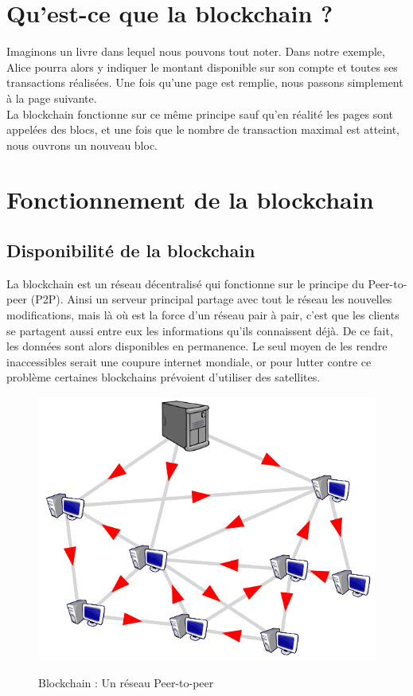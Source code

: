 \documentclass[12pt, a4paper, oneside]{book}
\begin{document}
    \section{Qu'est-ce que la blockchain ?}
    Imaginons un livre dans lequel nous pouvons tout noter. Dans notre exemple, Alice pourra alors y indiquer le montant disponible sur son compte et toutes ses transactions réalisées. Une fois qu’une page est remplie, nous passons simplement à la page suivante.
    \\
    La blockchain fonctionne sur ce même principe sauf qu’en réalité les pages sont appelées des blocs, et une fois que le nombre de transaction maximal est atteint, nous ouvrons un nouveau bloc.

    \section{Fonctionnement de la blockchain}
    
    \subsection{Disponibilité de la blockchain}
    La blockchain est un réseau décentralisé qui fonctionne sur le principe du Peer-to-peer (P2P). 
    Ainsi un serveur principal partage avec tout le réseau les nouvelles modifications, mais là où est la force d'un réseau pair à pair, c'est que les clients se partagent aussi 
    entre eux les informations qu'ils connaissent déjà. De ce fait, les données sont alors disponibles en permanence. Le seul moyen de les rendre inaccessibles serait une 
    coupure internet mondiale, or pour lutter contre ce problème certaines blockchains prévoient d'utiliser des satellites.
    
    \begin{figure}[H]
        \begin{center}
          \includegraphics[width=.69\textwidth]{images/peerToPeer.png}
          \label{fig:peerToPeer}
          \caption{Blockchain : Un réseau Peer-to-peer}
        \end{center}
    \end{figure}
\end{document}
